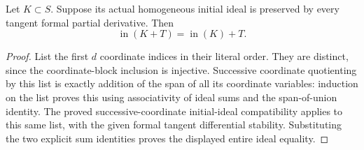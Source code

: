 \begin{theorem}
\label{hir:actual-normal-fibre-diagram-initial-cut}
\leanok
{}
Let $K\subset S$. Suppose its actual homogeneous initial ideal is
preserved by every tangent formal partial derivative. Then
\[
 \operatorname{in}(K+T)=\operatorname{in}(K)+T.
\]
\end{theorem}
\begin{proof}
List the first $d$ coordinate indices in their literal order. They are
distinct, since the coordinate-block inclusion is injective. Successive
coordinate quotienting by this list is exactly addition of the span of
all its coordinate variables: induction on the list proves this using
associativity of ideal sums and the span-of-union identity. The proved
successive-coordinate initial-ideal compatibility applies to this same
list, with the given formal tangent differential stability. Substituting
the two explicit sum identities proves the displayed entire ideal
equality.
\end{proof}

